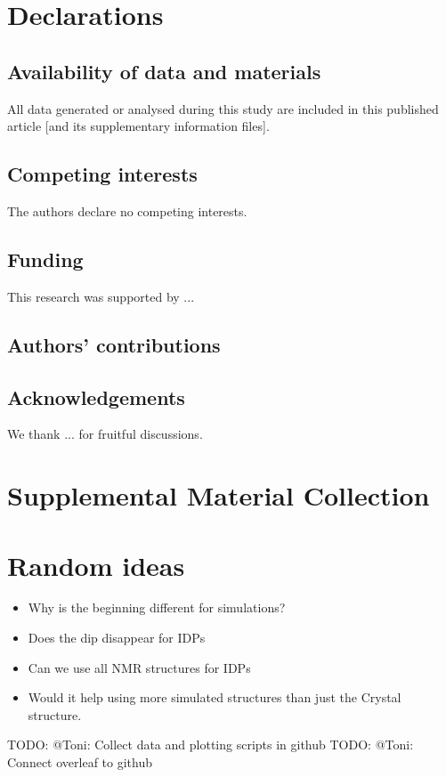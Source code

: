 \documentclass[reprint,amsmath,amssymb,rmp,onecolumn,notitlepage,11pt]{revtex4-1}
\begin{document}
\section*{Declarations}
\subsection{Availability of data and materials}
All data generated or analysed during this study are included in this published article [and its supplementary information files].
\subsection{Competing interests}
The authors declare no competing interests.
\subsection{Funding}
This research was supported by ...
\subsection{Authors' contributions}

\subsection{Acknowledgements}
We thank ... for fruitful discussions.




\appendix
\section{Supplemental Material Collection}
\section{Random ideas}
\begin{itemize}
    \item Why is the beginning different for simulations?
    \item Does the dip disappear for IDPs
    \item Can we use all NMR structures for IDPs
    \item Would it help using more simulated structures than just the Crystal structure. 
\end{itemize}
TODO: @Toni: Collect data and plotting scripts in github
TODO: @Toni: Connect overleaf to github
\end{document}
